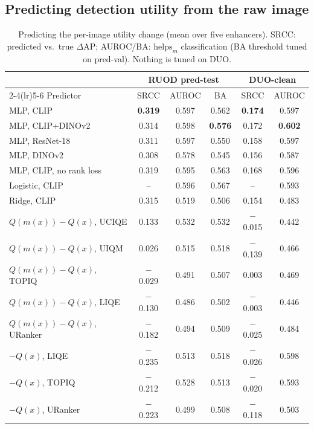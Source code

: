 \documentclass[conference]{IEEEtran}
\newcommand{\dap}{\Delta\mathrm{AP}}
\begin{document}
\subsection{Predicting detection utility from the raw image}
\begin{table}[t]
\centering
\caption{Predicting the per-image utility change (mean over five enhancers). SRCC: predicted vs.\ true $\dap$; AUROC/BA: $\text{helps}_m$ classification (BA threshold tuned on pred-val). Nothing is tuned on DUO.}
\label{tab:o4}
\setlength{\tabcolsep}{2.4pt}
\footnotesize
\begin{tabular}{@{}lccccc@{}}
\toprule
 & \multicolumn{3}{c}{RUOD pred-test} & \multicolumn{2}{c}{DUO-clean} \\
\cmidrule(lr){2-4}\cmidrule(lr){5-6}
Predictor & SRCC & AUROC & BA & SRCC & AUROC \\
\midrule
MLP, CLIP & \textbf{0.319} & 0.597 & 0.562 & \textbf{0.174} & 0.597 \\
MLP, CLIP+DINOv2 & 0.314 & 0.598 & \textbf{0.576} & 0.172 & \textbf{0.602} \\
MLP, ResNet-18 & 0.311 & 0.597 & 0.550 & 0.158 & 0.597 \\
MLP, DINOv2 & 0.308 & 0.578 & 0.545 & 0.156 & 0.587 \\
MLP, CLIP, no rank loss & 0.319 & 0.595 & 0.563 & 0.168 & 0.596 \\
Logistic, CLIP & -- & 0.596 & 0.567 & -- & 0.593 \\
Ridge, CLIP & 0.315 & 0.519 & 0.506 & 0.154 & 0.483 \\
\midrule
$Q(m(x))-Q(x)$, UCIQE & 0.133 & 0.532 & 0.532 & $-$0.015 & 0.442 \\
$Q(m(x))-Q(x)$, UIQM & 0.026 & 0.515 & 0.518 & $-$0.139 & 0.466 \\
$Q(m(x))-Q(x)$, TOPIQ & $-$0.029 & 0.491 & 0.507 & 0.003 & 0.469 \\
$Q(m(x))-Q(x)$, LIQE & $-$0.130 & 0.486 & 0.502 & $-$0.003 & 0.446 \\
$Q(m(x))-Q(x)$, URanker & $-$0.182 & 0.494 & 0.509 & $-$0.025 & 0.484 \\
$-Q(x)$, LIQE & $-$0.235 & 0.513 & 0.518 & $-$0.026 & 0.598 \\
$-Q(x)$, TOPIQ & $-$0.212 & 0.528 & 0.513 & $-$0.020 & 0.593 \\
$-Q(x)$, URanker & $-$0.223 & 0.499 & 0.508 & $-$0.118 & 0.503 \\
\bottomrule
\end{tabular}
\end{table}
\end{document}

